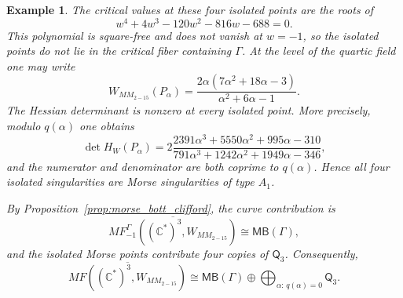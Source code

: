 \documentclass[11pt]{amsart}
\newtheorem{example}{Example}[section]
\newcommand{\MorseCat}[1]{\mathsf{Q}_{#1}}
\newcommand{\MBcat}[1]{\mathsf{MB}(#1)}
\begin{document}
\begin{example}
The critical values at these four isolated points are the roots of
\[
w^4+4w^3-120w^2-816w-688=0.
\]
This polynomial is square-free and does not vanish at $w=-1$, so the isolated
points do not lie in the critical fiber containing $\Gamma$.
At the level of the quartic field one may write
\[
W_{MM_{2-15}}(P_{\alpha})
=\frac{2\alpha(7\alpha^2+18\alpha-3)}{\alpha^2+6\alpha-1}.
\]
The Hessian determinant is nonzero at every isolated point. More precisely,
modulo $q(\alpha)$ one obtains
\[
\det H_W(P_{\alpha})
=2\frac{2391\alpha^3+5550\alpha^2+995\alpha-310}
{791\alpha^3+1242\alpha^2+1949\alpha-346},
\]
and the numerator and denominator are both coprime to $q(\alpha)$. Hence all
four isolated singularities are Morse singularities of type $A_1$.

By Proposition~\ref{prop:morse_bott_clifford}, the curve contribution is
\[
\overline{MF^{\Gamma}_{-1}((\mathbb{C}^*)^3,W_{MM_{2-15}})}
\cong \MBcat{\Gamma},
\]
and the isolated Morse points contribute four copies of $\MorseCat{3}$.
Consequently,
\[
\overline{MF((\mathbb{C}^*)^3,W_{MM_{2-15}})}
\cong \MBcat{\Gamma}\oplus \bigoplus_{\alpha:\,q(\alpha)=0}\MorseCat{3}.
\]
\end{example}
\end{document}

